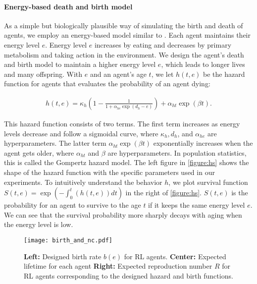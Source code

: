 \paragraph{Energy-based death and birth model}
As a simple but biologically plausible way of simulating the birth and death of agents, we employ an energy-based model similar to \citet{hamonEcoevolutionaryDynamicsNonepisodic2023}. Each agent maintains their energy level $e$. Energy level $e$ increases by eating and decreases by primary metabolism and taking action in the environment. We design the agent's death and birth model to maintain a higher energy level $e$, which leads to longer lives and many offspring. With $e$ and an agent's age $t$, we let $h(t, e)$ be the hazard function for agents that evaluates the probability of an agent dying:

\begin{align}
  h(t, e) = \kappa_{h} \left(1 - \frac{1}{1 + \alpha_{he} \exp(d_{h} - e)} \right) + \alpha_{ht} \exp(\beta t). \label{eq:h}
\end{align}

This hazard function\label{eq:h} consists of two terms. The first term increases as energy levels decrease and follow a sigmoidal curve, where $\kappa_{h}, d_{h}$, and $\alpha_{he}$ are hyperparameters. The latter term $\alpha_{ht} \exp(\beta t)$ exponentially increases when the agent gets older, where $\alpha_{ht}$ and $\beta$ are hyperparameters. In population statistics, this is called the Gompertz hazard model\citep{gompertzXXIVNatureFunction1825,kirkwoodDecipheringDeathCommentary2015}. The left figure in \cref{figure:hs} shows the shape of the hazard function with the specific parameters used in our experiments. To intuitively understand the behavior $h$, we plot survival function $S(t, e) = \exp (-\int_{0}^{t}(h(t, e)) dt)$ in the right of \cref{figure:hs}. $S(t, e)$ is the probability for an agent to survive to the age $t$ if it keeps the same energy level $e$. We can see that the survival probability more sharply decays with aging when the energy level is low.

\begin{figure}[t]
  \centering{}
  \texttt{[image: birth\_and\_nc.pdf]}
  \caption{
    \textbf{Left:} Designed birth rate $b(e)$ for RL agents.
    \textbf{Center:} Expected lifetime for each agent
    \textbf{Right:} Expected reproduction number $R$ for RL agents corresponding to the designed hazard and birth functions.
  }\label{figure:bnc}
\end{figure}

